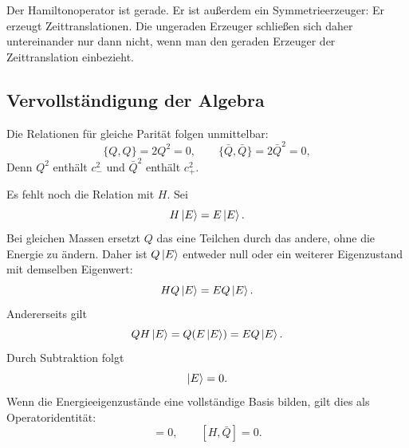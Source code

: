 Der Hamiltonoperator ist gerade. Er ist außerdem ein Symmetrieerzeuger: Er erzeugt Zeittranslationen. Die ungeraden Erzeuger schließen sich daher untereinander nur dann nicht, wenn man den geraden Erzeuger der Zeittranslation einbezieht.

\begin{classroomqa}
\end{classroomqa}

\subsection{Vervollständigung der Algebra}

Die Relationen für gleiche Parität folgen unmittelbar:
\begin{equation}
\{Q,Q\}=2Q^2=0,
\qquad
\{\bar Q,\bar Q\}=2\bar Q^2=0,
\end{equation}
Denn \(Q^2\) enthält \(c_-^2\) und \(\bar Q^2\) enthält \(c_+^2\).

Es fehlt noch die Relation mit \(H\). Sei
\begin{equation}
H\left\lvert E\right\rangle=E\left\lvert E\right\rangle.
\end{equation}
Bei gleichen Massen ersetzt \(Q\) das eine Teilchen durch das andere, ohne die Energie zu ändern. Daher ist \(Q\left\lvert E\right\rangle\) entweder null oder ein weiterer Eigenzustand mit demselben Eigenwert:
\begin{equation}
H Q\left\lvert E\right\rangle=E Q\left\lvert E\right\rangle.
\end{equation}
Andererseits gilt
\begin{equation}
QH\left\lvert E\right\rangle=Q(E\left\lvert E\right\rangle)=E Q\left\lvert E\right\rangle.
\end{equation}
Durch Subtraktion folgt
\begin{equation}
[H,Q]\ket{E}=0.
\end{equation}
Wenn die Energieeigenzustände eine vollständige Basis bilden, gilt dies als Operatoridentität:
\begin{equation}
[H,Q]=0,
\qquad
[H,\bar Q]=0.
\end{equation}

\begin{classroomqa}
\end{classroomqa}

